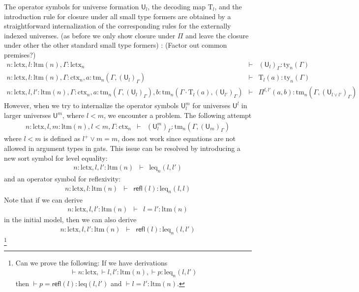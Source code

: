 \documentclass[11pt,a4paper]{article}
\theoremstyle{definition}
\newcommand{\UU}{\mathsf{U}}
\newcommand{\refl}{\mathsf{refl}}
\def\UU{\mathsf{U}}
\newcommand{\N}{\mathsf{N}}
\def\Pihat{\Pi}
\def\lctx{\mathrm{lctx}}
\def\ltm{\mathrm{ltm}}
\def\leq{\mathrm{leq}}
\newcommand{\ctx}{\mathrm{ctx}}
\newcommand{\ty}{\mathrm{ty}}
\newcommand{\tm}{\mathrm{tm}}
\def\U{\mathsf{U}}
\newcommand{\Ta}{\mathrm{T}}
\begin{document}
The operator symbols for universe formation $\UU_l$, the decoding map $\Ta_l$, and the introduction rule for closure under all small type formers are obtained by a straightforward internalization of the corresponding rules for the externally indexed universes. (as before we only show closure under $\Pi$ and leave the closure under other the other standard small type formers) : (Factor out common premises?)
\begin{eqnarray*}
n : \lctx, l : \ltm(n), \Gamma : \lctx_n &\vdash& (\U_{l})_\Gamma : \ty_n(\Gamma)\\
n : \lctx, l : \ltm(n), \Gamma : \ctx_n, a : \tm_n(\Gamma,(\U_{l})_\Gamma) &\vdash& {\Ta_{l}}(a) : \ty_n(\Gamma)\\
n : \lctx, l, l' : \ltm(n), \Gamma : \ctx_n,
a : \tm_n(\Gamma,(\U_{l})_\Gamma),
b :  \tm_n(\Gamma \cdot \Ta_{l}(a), (\U_{l'})_\Gamma)
&\vdash&
 \Pihat^{l,l'}(a,b) : \tm_n(\Gamma,(\U_{l \vee l'})_\Gamma)
\end{eqnarray*}
However, when we try to internalize the operator symbols $\UU^m_l$ for universes $\UU^l$ in larger universes $\UU^m$, where $l < m$, we encounter a problem. The following attempt
\begin{eqnarray*}
n : \lctx, l, m : \ltm(n), l < m, \Gamma : \ctx_n&\vdash&(\UU^m_l)_\Gamma: \tm_n(\Gamma,(\UU_{m})_\Gamma)
\end{eqnarray*}
where $l < m$ is defined as $l^+ \vee m = m$, does not work since equations are not allowed in argument types in gats. This issue can be resolved by introducing a new sort symbol for level equality:
\begin{eqnarray*}
n : \lctx, l, l'  : \ltm(n) &\vdash& \leq_n(l,l')
\end{eqnarray*}
and an operator symbol for reflexivity:
\begin{eqnarray*}
n : \lctx, l : \ltm(n) &\vdash& \refl(l) :  \leq_n(l,l)
\end{eqnarray*}
Note that if we can derive 
\begin{eqnarray*}
n : \lctx, l, l'  : \ltm(n) &\vdash& l = l' : \ltm(n)
\end{eqnarray*}
in the initial model, then we can also derive
\begin{eqnarray*}
n : \lctx, l,l' : \ltm(n) &\vdash& \refl(l) :  \leq_n(l,l')
\end{eqnarray*}
\footnote{Can we prove the following:
If we have derivations
\begin{eqnarray*}
\vdash n : \lctx, \vdash l,l' : \ltm(n), \vdash p :  \leq_n(l,l')
\end{eqnarray*}
then $\vdash p = \refl(l) : \leq(l,l')$ and $\vdash l = l' : \ltm(n)$.
}
\end{document}
